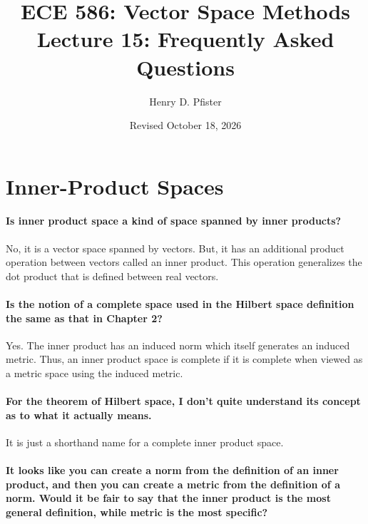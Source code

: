 \documentclass[10pt,english]{article}
\begin{document}
\title{ECE 586: Vector Space Methods \\ Lecture 15: Frequently Asked Questions}
\author{Henry D. Pfister \\ \univ}
\date{Revised October 18, 2026}

\maketitle

\section{Inner-Product Spaces}
\paragraph{Is inner product space a kind of space spanned by inner products?}

No, it is a vector space spanned by vectors.
But, it has an additional product operation between vectors called an inner product.
This operation generalizes the dot product that is defined between real vectors.

\paragraph{Is the notion of a complete space used in the Hilbert space definition the same as that in Chapter 2?}
Yes.
The inner product has an induced norm which itself generates an induced metric.
Thus, an inner product space is complete if it is complete when viewed as a metric space using the induced metric.

\paragraph{For the theorem of Hilbert space, I don't quite understand its concept as to what it actually means.}

It is just a shorthand name for a complete inner product space.

\paragraph{It looks like you can create a norm from the definition of an inner product, and then you can create a metric from the definition of a norm. Would it be fair to say that the inner product is the most general definition, while metric is the most specific?}
\end{document}
